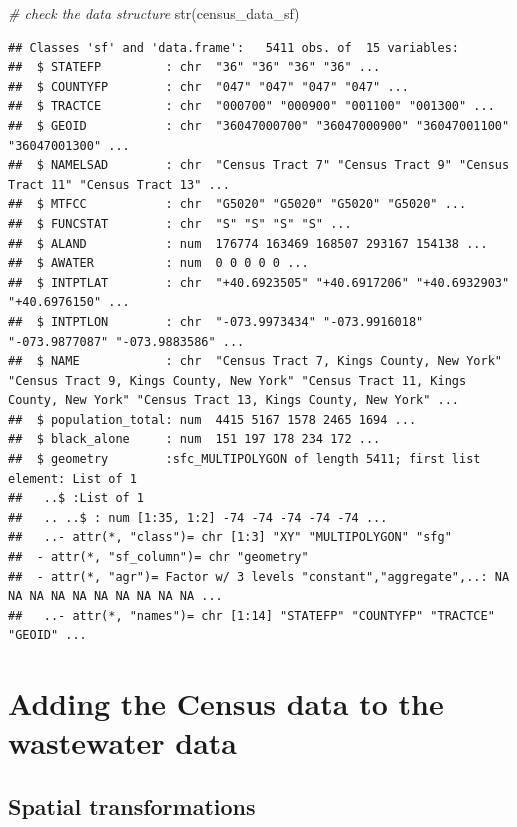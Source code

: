 \documentclass[
]{book}
\newenvironment{Shaded}{\begin{snugshade}}{\end{snugshade}}
\newcommand{\CommentTok}[1]{\textcolor[rgb]{0.56,0.35,0.01}{\textit{#1}}}
\newcommand{\FunctionTok}[1]{\textcolor[rgb]{0.00,0.00,0.00}{#1}}
\newcommand{\NormalTok}[1]{#1}
\begin{document}
\begin{Shaded}
\begin{Highlighting}[]
\CommentTok{\# check the data structure}
\FunctionTok{str}\NormalTok{(census\_data\_sf)}
\end{Highlighting}
\end{Shaded}

\begin{verbatim}
## Classes 'sf' and 'data.frame':   5411 obs. of  15 variables:
##  $ STATEFP         : chr  "36" "36" "36" "36" ...
##  $ COUNTYFP        : chr  "047" "047" "047" "047" ...
##  $ TRACTCE         : chr  "000700" "000900" "001100" "001300" ...
##  $ GEOID           : chr  "36047000700" "36047000900" "36047001100" "36047001300" ...
##  $ NAMELSAD        : chr  "Census Tract 7" "Census Tract 9" "Census Tract 11" "Census Tract 13" ...
##  $ MTFCC           : chr  "G5020" "G5020" "G5020" "G5020" ...
##  $ FUNCSTAT        : chr  "S" "S" "S" "S" ...
##  $ ALAND           : num  176774 163469 168507 293167 154138 ...
##  $ AWATER          : num  0 0 0 0 0 ...
##  $ INTPTLAT        : chr  "+40.6923505" "+40.6917206" "+40.6932903" "+40.6976150" ...
##  $ INTPTLON        : chr  "-073.9973434" "-073.9916018" "-073.9877087" "-073.9883586" ...
##  $ NAME            : chr  "Census Tract 7, Kings County, New York" "Census Tract 9, Kings County, New York" "Census Tract 11, Kings County, New York" "Census Tract 13, Kings County, New York" ...
##  $ population_total: num  4415 5167 1578 2465 1694 ...
##  $ black_alone     : num  151 197 178 234 172 ...
##  $ geometry        :sfc_MULTIPOLYGON of length 5411; first list element: List of 1
##   ..$ :List of 1
##   .. ..$ : num [1:35, 1:2] -74 -74 -74 -74 -74 ...
##   ..- attr(*, "class")= chr [1:3] "XY" "MULTIPOLYGON" "sfg"
##  - attr(*, "sf_column")= chr "geometry"
##  - attr(*, "agr")= Factor w/ 3 levels "constant","aggregate",..: NA NA NA NA NA NA NA NA NA NA ...
##   ..- attr(*, "names")= chr [1:14] "STATEFP" "COUNTYFP" "TRACTCE" "GEOID" ...
\end{verbatim}

\hypertarget{adding-the-census-data-to-the-wastewater-data}{%
\section{Adding the Census data to the wastewater data}\label{adding-the-census-data-to-the-wastewater-data}}

\hypertarget{spatial-transformations}{%
\subsection{Spatial transformations}\label{spatial-transformations}}
\end{document}
